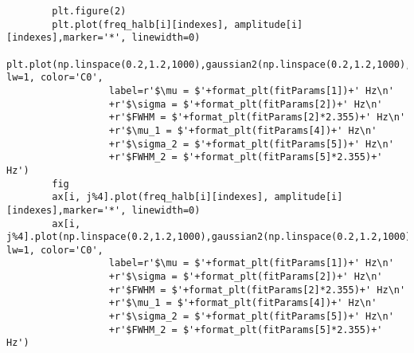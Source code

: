 \documentclass[a4paper,10pt]{article}
\begin{document}
\begin{lstlisting}
        plt.figure(2)
        plt.plot(freq_halb[i][indexes], amplitude[i][indexes],marker='*', linewidth=0) 
        plt.plot(np.linspace(0.2,1.2,1000),gaussian2(np.linspace(0.2,1.2,1000),*fitParams), lw=1, color='C0',
                  label=r'$\mu = $'+format_plt(fitParams[1])+' Hz\n'
                  +r'$\sigma = $'+format_plt(fitParams[2])+' Hz\n'
                  +r'$FWHM = $'+format_plt(fitParams[2]*2.355)+' Hz\n'
                  +r'$\mu_1 = $'+format_plt(fitParams[4])+' Hz\n'
                  +r'$\sigma_2 = $'+format_plt(fitParams[5])+' Hz\n'
                  +r'$FWHM_2 = $'+format_plt(fitParams[5]*2.355)+' Hz')
        fig
        ax[i, j%4].plot(freq_halb[i][indexes], amplitude[i][indexes],marker='*', linewidth=0) 
        ax[i, j%4].plot(np.linspace(0.2,1.2,1000),gaussian2(np.linspace(0.2,1.2,1000),*fitParams), lw=1, color='C0',
                  label=r'$\mu = $'+format_plt(fitParams[1])+' Hz\n'
                  +r'$\sigma = $'+format_plt(fitParams[2])+' Hz\n'
                  +r'$FWHM = $'+format_plt(fitParams[2]*2.355)+' Hz\n'
                  +r'$\mu_1 = $'+format_plt(fitParams[4])+' Hz\n'
                  +r'$\sigma_2 = $'+format_plt(fitParams[5])+' Hz\n'
                  +r'$FWHM_2 = $'+format_plt(fitParams[5]*2.355)+' Hz')
\end{lstlisting}
\end{document}

